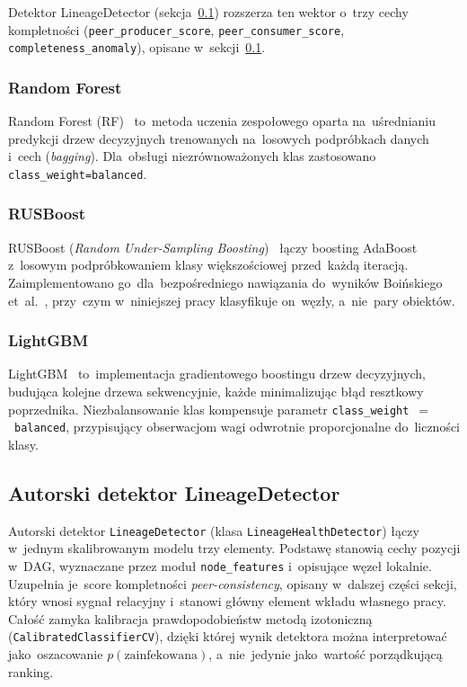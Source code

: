 Detektor LineageDetector (sekcja~\ref{sec:lineage-detector})
rozszerza ten wektor o~trzy cechy kompletności
(\texttt{peer\_producer\_score}, \texttt{peer\_consumer\_score},
\texttt{completeness\_anomaly}), opisane w~sekcji~\ref{sec:lineage-detector}.

\subsubsection{Random Forest}

Random Forest (RF)~\cite{Breiman2001} to~metoda uczenia zespołowego oparta na~uśrednianiu
predykcji drzew decyzyjnych trenowanych na~losowych podpróbkach danych
i~cech (\emph{bagging}). Dla~obsługi niezrównoważonych klas zastosowano
\texttt{class\_weight=\textquotedbl{}balanced\textquotedbl{}}.

\subsubsection{RUSBoost}

RUSBoost (\emph{Random Under-Sampling Boosting})~\cite{Seiffert2010} łączy boosting AdaBoost
z~losowym podpróbkowaniem klasy większościowej przed~każdą iteracją.
Zaimplementowano go~dla~bezpośredniego nawiązania do~wyników Boińskiego
et~al.~\cite{Boinski2025}, przy~czym w~niniejszej pracy klasyfikuje on~węzły,
a~nie~pary obiektów.

\subsubsection{LightGBM}

LightGBM~\cite{Ke2017} to~implementacja gradientowego boostingu drzew decyzyjnych,
budująca kolejne drzewa sekwencyjnie, każde minimalizując błąd resztkowy
poprzednika. Niezbalansowanie klas kompensuje parametr
\texttt{class\_weight}~$=$~\texttt{balanced}, przypisujący obserwacjom wagi
odwrotnie proporcjonalne do~liczności klasy.

\subsection{Autorski detektor LineageDetector}
\label{sec:lineage-detector}

Autorski detektor \texttt{LineageDetector} (klasa
\texttt{LineageHealthDetector}) łączy w~jednym skalibrowanym modelu trzy
elementy. Podstawę stanowią cechy pozycji w~DAG, wyznaczane przez moduł
\texttt{node\_features} i~opisujące węzeł lokalnie. Uzupełnia je~score
kompletności \emph{peer-consistency}, opisany w~dalszej części sekcji,
który wnosi sygnał relacyjny i~stanowi główny element wkładu własnego pracy.
Całość zamyka kalibracja prawdopodobieństw metodą izotoniczną
(\texttt{CalibratedClassifierCV}), dzięki której wynik detektora można
interpretować jako~oszacowanie $p(\text{zainfekowana})$, a~nie~jedynie
jako~wartość porządkującą ranking.

